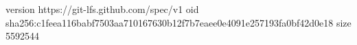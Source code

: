 version https://git-lfs.github.com/spec/v1
oid sha256:c1feea116babf7503aa710167630b12f7b7eaee0e4091e257193fa0bf42d0e18
size 5592544
